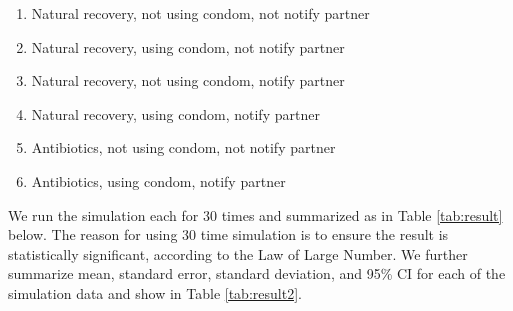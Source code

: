 \documentclass{article}
\begin{document}
\begin{normalsize}
	\begin{enumerate}
		\item Natural recovery, not using condom, not notify partner
		\item Natural recovery, using condom, not notify partner
		\item Natural recovery, not using condom, notify partner
		\item  Natural recovery, using condom, notify partner
		\item Antibiotics, not using condom, not notify partner
		\item  Antibiotics, using condom, notify partner
	\end{enumerate}


We run the simulation each for $30$ times and summarized as in Table \ref{tab:result} below. The reason for using $30$ time simulation is to ensure the result is statistically significant, according to the Law of Large Number. We further summarize mean, standard error, standard deviation, and 95\% CI for each of the  simulation data and show in Table \ref{tab:result2}.


\end{normalsize}
\end{document}
